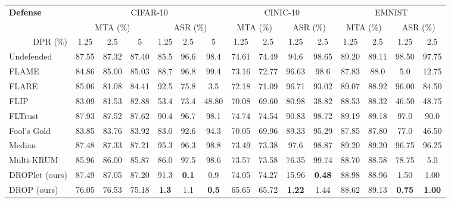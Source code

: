 \begin{table*}[h]
    \centering
    \begin{tabular}{l|ccc|ccc|cc|cc|cc|cc}
    \toprule
    \multirow{2}{*}{\textbf{Defense}} & \multicolumn{6}{c}{CIFAR-10} & \multicolumn{4}{c}{CINIC-10} & \multicolumn{4}{c}{EMNIST} \\
     & \multicolumn{3}{c}{MTA (\%)} & \multicolumn{3}{c}{ASR (\%)} & \multicolumn{2}{c}{MTA (\%)} & \multicolumn{2}{c}{ASR (\%)} & \multicolumn{2}{c}{MTA (\%)} & \multicolumn{2}{c}{ASR (\%)} \\
     \cline{2-15}
     \multicolumn{1}{r|}{DPR (\%)} & 1.25 & 2.5 & 5 & 1.25 & 2.5 & 5 & 1.25 & 2.5 & 1.25 & 2.5 & 1.25 & 2.5 & 1.25 & 2.5 \\
    \midrule
    Undefended & 87.55 & 87.32 & 87.40 & 85.5 & 96.6 & 98.4 & 74.61 & 74.49 & 94.6 & 98.65 & 89.20 & 89.11 & 98.50 & 97.75 \\
    \hline
    FLAME & 84.86 & 85.00 & 85.03 & 88.7 & 96.8 & 99.4 & 73.16 & 72.77 & 96.63 & 98.6 & 87.83 & 88.0 & 5.0 & 12.75 \\
    FLARE & 85.06 & 81.08 & 84.41 & 92.5 & 75.8 & 3.5 & 72.18 & 71.09 &  96.71 & 93.02 & 89.07 & 88.92 & 96.00 & 84.50 \\
    FLIP & 83.09 & 81.53 & 82.88 & 53.4 & 73.4 & 48.80 & 70.08 & 69.60 & 80.98 & 38.82 & 88.53 & 88.32 & 46.50 & 48.75 \\
    FLTrust & 87.93 & 87.52 & 87.62 & 90.4 & 96.7 & 98.1 & 74.74 & 74.54 & 90.83 & 98.72 & 89.19 & 89.18 & 97.0 & 90.0 \\
    Fool's Gold & 83.85 & 83.76 & 83.92 & 83.0 & 92.6 & 94.3 & 70.05 & 69.96 & 89.33 & 95.29 & 87.85 & 87.80 & 77.0 & 46.50 \\
    Median & 87.48 & 87.33 & 87.21 & 95.3 & 96.3 & 98.8 & 73.49 & 73.38 & 97.6 & 98.87 & 89.20 & 89.20 & 96.75 & 96.25 \\
    Multi-KRUM & 85.96 & 86.00 & 85.87 & 86.0 & 97.5 & 98.6 & 73.57 & 73.58 & 76.35 & 99.74 & 88.70 & 88.58 & 78.75 & 5.0 \\
    \hline
    DROPlet (ours) & 87.49 & 87.05 & 87.20 & 91.3 & \textbf{0.1} & 0.9 & 74.05 & 74.27 & 15.96 & \textbf{0.48} & 88.98 & 88.96 & 1.50 & 1.00 \\
    DROP (ours) & 76.05 & 76.53 & 75.18 & \textbf{1.3} & 1.1 & \textbf{0.5} & 65.65 & 65.72 & \textbf{1.22} & 1.44 & 88.62 & 89.13 & \textbf{0.75} & \textbf{1.00} \\
    \bottomrule
    \end{tabular}

\end{table*}
